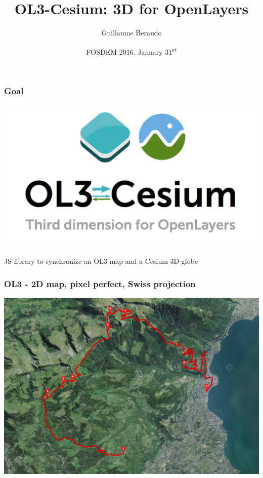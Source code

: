 \documentclass{beamer}
\title{OL3-Cesium: 3D for OpenLayers}
\author{Guillaume Beraudo}
\institute{Opensource Engineer\\Camptocamp, Switzerland}
\date{FOSDEM 2016, January 31\textsuperscript{st}}
\begin{document}
  \begin{frame}
    \titlepage
  \end{frame}

  \begin{frame}
       \frametitle{Goal}
    \begin{center}
        \includegraphics[width=.3\linewidth]{./ol3-cesium-wide_arrows.png}
    \end{center}

      JS library to synchronize an OL3 map and a Cesium 3D globe
  \end{frame}


  \begin{frame}
    \frametitle{OL3 - 2D map, pixel perfect, Swiss projection}
		\begin{center}
		  \includegraphics[width=1.0 \linewidth]{./vtt_2d.png}
		\end{center}
  \end{frame}
\end{document}
